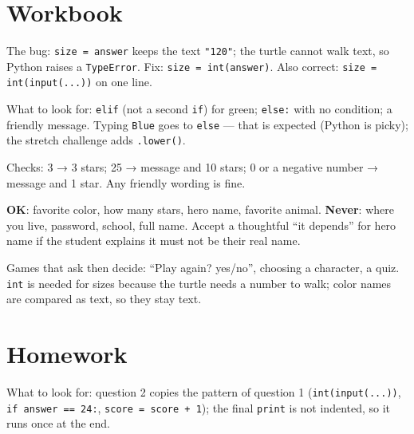 
\section{Workbook}
\begin{answer}
The bug: \texttt{size = answer} keeps the text \texttt{"120"}; the turtle cannot walk text, so Python raises a \texttt{TypeError}. Fix: \texttt{size = int(answer)}. Also correct: \texttt{size = int(input(...))} on one line.
\end{answer}

\begin{answer}
What to look for: \texttt{elif} (not a second \texttt{if}) for green; \texttt{else:} with no condition; a friendly message. Typing \texttt{Blue} goes to \texttt{else} --- that is expected (Python is picky); the stretch challenge adds \texttt{.lower()}.
\end{answer}

\begin{answer}
Checks: 3 → 3 stars; 25 → message and 10 stars; 0 or a negative number → message and 1 star. Any friendly wording is fine.
\end{answer}

\begin{answer}
\textbf{OK}: favorite color, how many stars, hero name, favorite animal. \textbf{Never}: where you live, password, school, full name. Accept a thoughtful \enquote{it depends} for hero name if the student explains it must not be their real name.
\end{answer}

\begin{answer}[Reflection]
Games that ask then decide: \enquote{Play again? yes/no}, choosing a character, a quiz. \texttt{int} is needed for sizes because the turtle needs a number to walk; color names are compared as text, so they stay text.
\end{answer}

\section{Homework}
\begin{answer}
What to look for: question 2 copies the pattern of question 1 (\texttt{int(input(...))}, \texttt{if answer == 24:}, \texttt{score = score + 1}); the final \texttt{print} is not indented, so it runs once at the end.
\end{answer}

